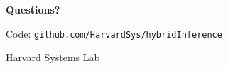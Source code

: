 \documentclass[aspectratio=169,10pt]{beamer}
\begin{document}
\begin{frame}{}
\vspace{1.5cm}
\begin{center}
\textcolor{icmlblue}{\Huge \textbf{Questions?}}

\vspace{1cm}
\large
Code: \texttt{github.com/HarvardSys/hybridInference}

\vspace{0.5cm}
\normalsize
Harvard Systems Lab
\end{center}
\end{frame}

\appendix
\end{document}
